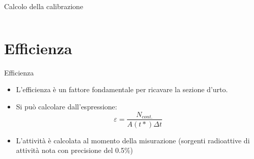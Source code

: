 \documentclass [xcolor=svgnames] {beamer}
\begin{document}
\begin{frame}{Calcolo della calibrazione}
\begin{columns}
\begin{column}{0.45\textwidth}
		\end{column}
	\end{columns}
\end{frame}%

\section{Efficienza}
\begin{frame}{Efficienza}
	\begin{itemize}
		\item<1-> L'efficienza è un fattore fondamentale per ricavare la sezione d'urto.
		\item<2-> Si può calcolare dall'espressione:
		\begin{equation}
			\varepsilon = \dfrac{N_{cont.}}{A(t*) \Delta t}
		\end{equation}
		\item<3-> L'attività è calcolata al momento della misurazione (sorgenti radioattive di attività nota con precisione del 0.5\%) %
	\end{itemize}
	
	\vspace{0.5cm}
	

\end{frame}
\end{document}
